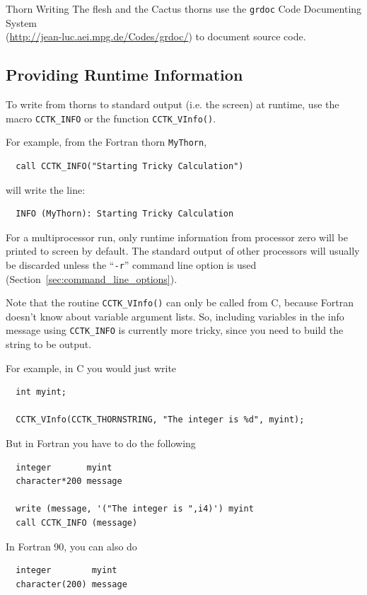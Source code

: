 \begin{cactuspart}{Thorn Writing}
The flesh and the Cactus thorns use the \texttt{grdoc} Code Documenting
System\\(\url{http://jean-luc.aei.mpg.de/Codes/grdoc/}) to document
source code.


\subsection{Providing Runtime Information}
\label{sec:prrutiin}

To write from thorns to standard output (i.e. the screen)
at runtime, use the macro \texttt{CCTK\_INFO} or the function \texttt{CCTK\_VInfo()}.

For example, from the Fortran thorn \texttt{MyThorn},
\begin{verbatim}
  call CCTK_INFO("Starting Tricky Calculation")
\end{verbatim}
%
will write the line:
\begin{verbatim}
  INFO (MyThorn): Starting Tricky Calculation
\end{verbatim}

For a multiprocessor run, only runtime information from processor zero
will be printed to screen by default. The standard output of other processors
will usually be discarded unless the ``\texttt{-r}'' command line option is used
(Section~\ref{sec:command_line_options}).

Note that the routine \texttt{CCTK\_VInfo()} can only be called from C, because
Fortran doesn't know about variable argument lists. So, including variables in
the info message using \texttt{CCTK\_INFO} is currently more tricky, since you
need to build the string to be output.

For example, in C you would just write
\begin{verbatim}
  int myint;

  CCTK_VInfo(CCTK_THORNSTRING, "The integer is %d", myint);
\end{verbatim}

But in Fortran you have to do the following
\begin{verbatim}
  integer       myint
  character*200 message

  write (message, '("The integer is ",i4)') myint
  call CCTK_INFO (message)
\end{verbatim}

In Fortran 90, you can also do
\begin{verbatim}
  integer        myint
  character(200) message


\end{verbatim}
\end{cactuspart}

